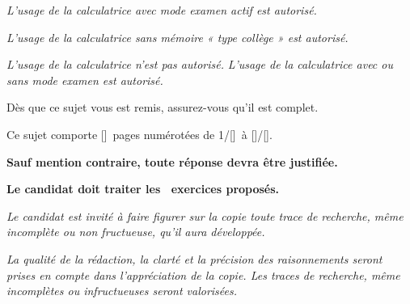 {{\begin{center}
    \vspace*{15mm}
    
      {%
        \textit{L’usage de la calculatrice avec mode examen actif est autorisé.}
        
        \medskip
        
        \textit{L’usage de la calculatrice sans mémoire « type collège » est autorisé.}
      }%
      {%
          {%
            \textit{L’usage de la calculatrice n’est pas autorisé.}
          }%
          {%
            \textit{L’usage de la calculatrice avec ou sans mode examen est autorisé.}
          }%
      }%
    \vspace*{10mm}
    
    Dès que ce sujet vous est remis, assurez-vous qu’il est complet.
    
    \smallskip
    
    Ce sujet comporte [\packlastpage]\ pages numérotées de 1/[\packlastpage]\ à [\packlastpage]/[\packlastpage].
  \end{center}
  \begin{center}
    \parbox{\useKV[EnteteSujetBac]{LargeurPar}}{%
      {%
        \vspace*{10mm}
        
        \noindent\textbf{Sauf mention contraire, toute réponse devra être justifiée.}
      }%
      {}%
      {%
        \vspace*{5mm}
        
        \noindent\textbf{Le candidat doit traiter les \ exercices proposés.}
      }%
      {}%
      {%
        \vspace*{10mm}
        
        \noindent\textit{Le candidat est invité à faire figurer sur la copie toute trace de recherche, même incomplète ou non fructueuse, qu’il aura développée.}
      }%
      {}%
      {%
        \vspace*{2mm}
        
        \noindent\textit{La qualité de la rédaction, la clarté et la précision des raisonnements seront prises en compte dans l’appréciation de la copie. Les traces de recherche, même incomplètes ou infructueuses seront valorisées.}
      }%
      {}%
    }%
  \end{center}%
  }%
  \pagebreak
}

